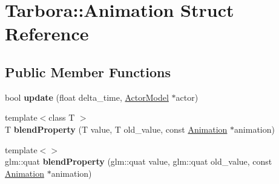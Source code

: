 \hypertarget{structTarbora_1_1Animation}{}\section{Tarbora\+:\+:Animation Struct Reference}
\label{structTarbora_1_1Animation}
\subsection*{Public Member Functions}
\begin{DoxyCompactItemize}
\item 
\mbox{\label{structTarbora_1_1Animation_ad126137d30e797c264694cfe200392c4}} 
bool {\bfseries update} (float delta\+\_\+time, \hyperlink{classTarbora_1_1ActorModel}{Actor\+Model} $\ast$actor)
\item 
\mbox{\label{structTarbora_1_1Animation_a21d9ea91e21a8ebe153aeb3ac5f1b034}} 
{\footnotesize template$<$class T $>$ }\\T {\bfseries blend\+Property} (T value, T old\+\_\+value, const \hyperlink{structTarbora_1_1Animation}{Animation} $\ast$animation)
\item 
\mbox{\label{structTarbora_1_1Animation_ad822c0f4505383d6c3f70f4a24d8b364}} 
{\footnotesize template$<$$>$ }\\glm\+::quat {\bfseries blend\+Property} (glm\+::quat value, glm\+::quat old\+\_\+value, const \hyperlink{structTarbora_1_1Animation}{Animation} $\ast$animation)
\end{DoxyCompactItemize}
